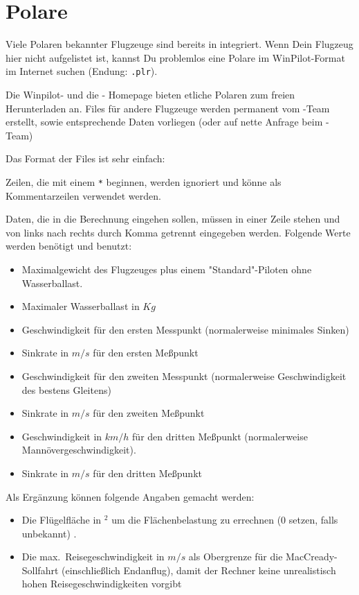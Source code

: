 \section{Polare}\label{sec:glide-polar}

Viele Polaren bekannter Flugzeuge sind bereits in \xc integriert.  Wenn Dein Flugzeug  hier nicht
aufgelistet ist, kannst Du problemlos eine Polare im {\sc WinPilot}-Format im Internet suchen (Endung:
\verb|.plr|).

Die Winpilot- und die \xc - Homepage bieten etliche Polaren zum freien Herunterladen an. Files für
andere Flugzeuge werden permanent vom \xc-Team erstellt, sowie entsprechende Daten vorliegen (oder
auf nette Anfrage beim \xc-Team)

Das Format der Files ist sehr einfach:

Zeilen, die mit einem \verb|*| beginnen, werden ignoriert und könne als Kommentarzeilen verwendet
werden.

Daten, die in die Berechnung eingehen sollen, müssen in einer Zeile stehen und von links nach rechts durch
Komma getrennt eingegeben werden. Folgende Werte werden benötigt und benutzt:

\begin{itemize}
\item Maximalgewicht des Flugzeuges  plus einem "Standard"-Piloten ohne Wasserballast.
\item Maximaler Wasserballast in $Kg$
\item Geschwindigkeit für den ersten Messpunkt (normalerweise minimales Sinken)
\item Sinkrate in $m/s$ für den ersten Meßpunkt
\item Geschwindigkeit für den zweiten  Messpunkt (normalerweise Geschwindigkeit des bestens
    Gleitens)
\item Sinkrate in $m/s$ für den zweiten Meßpunkt
\item Geschwindigkeit in $km/h$ für den dritten Meßpunkt  (normalerweise Mannövergeschwindigkeit).
\item Sinkrate in $m/s$ für den dritten Meßpunkt
\end{itemize}

Als Ergänzung können folgende Angaben gemacht werden:
\begin{itemize}
\item Die Flügelfläche in $^2$ um die Flächenbelastung zu errechnen  (0 setzen, falls unbekannt) .
\item Die max.\  Reisegeschwindigkeit in $m/s$ als Obergrenze für die
 MacCready-Sollfahrt (einschließlich Endanflug), damit der Rechner keine
 unrealistisch hohen Reisegeschwindigkeiten vorgibt
\end{itemize}

